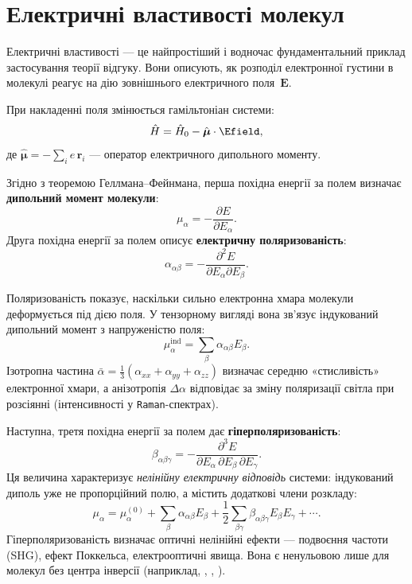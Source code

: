 \section{Електричні властивості молекул}\label{sec:elprop}

Електричні властивості --- це найпростіший і водночас фундаментальний приклад застосування теорії відгуку.
Вони описують, як розподіл електронної густини в молекулі реагує на дію зовнішнього електричного поля~$\mathbf{E}$.

При накладенні поля змінюється гамільтоніан системи:
\[
\hat{H} = \hat{H}_0 - \hat{\boldsymbol{\mu}}\cdot \Efield,
\]
де $\hat{\boldsymbol{\mu}} = -\sum_i e\,\mathbf{r}_i$ --- оператор електричного дипольного моменту.

Згідно з теоремою Геллмана–Фейнмана, перша похідна енергії за полем визначає
\textbf{дипольний момент молекули}:
\[
\mu_\alpha = -\frac{\partial E}{\partial E_\alpha}.
\]
Друга похідна енергії за полем описує \textbf{електричну поляризованість}:
\[
\alpha_{\alpha\beta} = -\frac{\partial^2 E}{\partial E_\alpha \partial E_\beta}.
\]

Поляризованість показує, наскільки сильно електронна хмара молекули деформується під дією поля.
У тензорному вигляді вона зв’язує індукований дипольний момент з напруженістю поля:
\[
\mu_\alpha^{\text{ind}} = \sum_\beta \alpha_{\alpha\beta} E_\beta.
\]
Ізотропна частина $\bar{\alpha} = \tfrac{1}{3}(\alpha_{xx}+\alpha_{yy}+\alpha_{zz})$
визначає середню «стисливість» електронної хмари,
а анізотропія $\Delta\alpha$ відповідає за зміну поляризації світла при розсіянні
(інтенсивності у \texttt{Raman}-спектрах).

\vspace{1em}
Наступна, третя похідна енергії за полем дає \textbf{гіперполяризованість}:
\[
\beta_{\alpha\beta\gamma} = -\frac{\partial^3 E}
{\partial E_\alpha\,\partial E_\beta\,\partial E_\gamma}.
\]
Ця величина характеризує \emph{нелінійну електричну відповідь} системи:
індукований диполь уже не пропорційний полю, а містить додаткові члени розкладу:
\[
\mu_\alpha = \mu_\alpha^{(0)}
+ \sum_\beta \alpha_{\alpha\beta} E_\beta
+ \frac{1}{2}\sum_{\beta\gamma}\beta_{\alpha\beta\gamma}E_\beta E_\gamma + \cdots.
\]
Гіперполяризованість визначає оптичні нелінійні ефекти ---
подвоєння частоти (SHG), ефект Поккельса, електрооптичні явища.
Вона є ненульовою лише для молекул без центра інверсії (наприклад, , , ).

